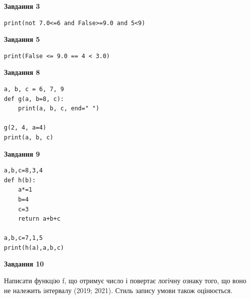 \documentclass[12pt, ukrainian]{article}
\begin{document}
{\begin {large}
\begin{minipage}[t]{7.5cm}
\end{minipage}
\vline \hspace{6mm}
\begin{minipage}[t]{10.5cm}

\begin{center}
\textbf{Завдання 3}
\end{center}

\begin{verbatim}
print(not 7.0<=6 and False>=9.0 and 5<9)
\end{verbatim}



\begin{center}
\textbf{Завдання 5}
\end{center}

\begin{verbatim}
print(False <= 9.0 == 4 < 3.0)
\end{verbatim}



\begin{center}
\textbf{Завдання 8}
\end{center}

\begin{verbatim}
a, b, c = 6, 7, 9
def g(a, b=8, c):
    print(a, b, c, end=" ")

g(2, 4, a=4)
print(a, b, c)
\end{verbatim}



\begin{center}
\textbf{Завдання 9}
\end{center}

\begin{verbatim}
a,b,c=8,3,4
def h(b):
    a*=1
    b=4
    c=3
    return a+b+c

a,b,c=7,1,5
print(h(a),a,b,c)
\end{verbatim}



\begin{center}
\textbf{Завдання 10}
\end{center}

Написати функцiю f, що отримує число і повертає логічну ознаку того, що воно не належить iнтервалу (2019; 2021). Стиль запису умови також оцінюється.\par

\end{minipage}

\end {large}}
\newpage
\end{document}
